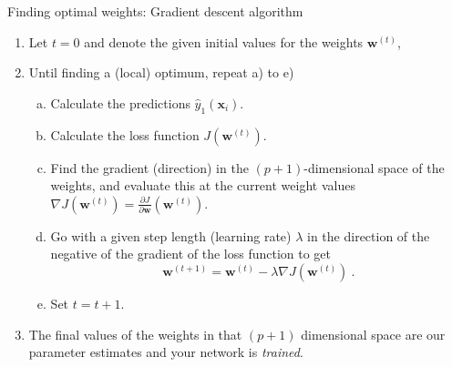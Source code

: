 \documentclass[10pt,ignorenonframetext,]{beamer}
\providecommand{\tightlist}{%
  \setlength{\itemsep}{0pt}\setlength{\parskip}{0pt}}
\begin{document}
\begin{frame}

\begin{block}{Finding optimal weights: Gradient descent algorithm}

\vspace{2mm}

\begin{enumerate}
\tightlist
\item
  Let \(t=0\) and denote the given initial values for the weights
  \({\boldsymbol w}^{(t)}\), \vspace{2mm}
\item
  Until finding a (local) optimum, repeat a) to e)

  \begin{enumerate}
  [a)]
  \tightlist
  \item
    Calculate the predictions \({\hat{y}_1({\boldsymbol x}_i)}\).
  \item
    Calculate the loss function \(J({\boldsymbol w}^{(t)})\).
  \item
    Find the gradient (direction) in the \((p+1)\)-dimensional space of
    the weights, and evaluate this at the current weight values
    \(\nabla J({\boldsymbol w}^{(t)})={\frac{\partial J}{\partial {\boldsymbol w}}}({\boldsymbol w}^{(t)})\).
  \item
    Go with a given step length (learning rate) \(\lambda\) in the
    direction of the negative of the gradient of the loss function to
    get
    \[{\boldsymbol w}^{(t+1)}={\boldsymbol w}^{(t)} - \lambda \nabla J({\boldsymbol w}^{(t)}) \ .\]
  \item
    Set \(t=t+1\). \vspace{2mm}
  \end{enumerate}
\item
  The final values of the weights in that \((p+1)\) dimensional space
  are our parameter estimates and your network is \emph{trained}.
\end{enumerate}

\end{block}

\end{frame}
\end{document}
